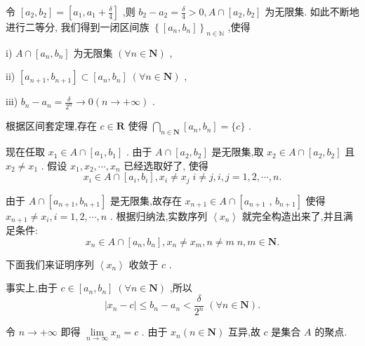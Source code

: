 令 $\left\lbrack  {{a}_{2},{b}_{2}}\right\rbrack   = \left\lbrack  {{a}_{1},{a}_{1} + \frac{\delta }{4}}\right\rbrack$ ,则 ${b}_{2} - {a}_{2} = \frac{\delta }{4} > 0,A \cap  \left\lbrack  {{a}_{2},{b}_{2}}\right\rbrack$ 为无限集. 如此不断地进行二等分, 我们得到一闭区间族 ${\left\{  \left\lbrack  {a}_{n},{b}_{n}\right\rbrack  \right\}  }_{n \in  \mathbb{N}}$ ,使得

i) $A \cap  \left\lbrack  {{a}_{n},{b}_{n}}\right\rbrack$ 为无限集 $\left( {\forall n \in  \mathbf{N}}\right)$ ,

ii) $\left\lbrack  {{a}_{n + 1},{b}_{n + 1}}\right\rbrack   \subset  \left\lbrack  {{a}_{n},{b}_{n}}\right\rbrack  \;\left( {\forall n \in  \mathbf{N}}\right)$ ,

iii) ${b}_{n} - {a}_{n} = \frac{\delta }{{2}^{n}} \rightarrow  0\left( {n \rightarrow   + \infty }\right)$ .

根据区间套定理,存在 $c \in  \mathbf{R}$ 使得 $\mathop{\bigcap }\limits_{{n \in  \mathbf{N}}}\left\lbrack  {{a}_{n},{b}_{n}}\right\rbrack   = \{ c\}$ .

现在任取 ${x}_{1} \in  A \cap  \left\lbrack  {{a}_{1},{b}_{1}}\right\rbrack$ . 由于 $A \cap  \left\lbrack  {{a}_{2},{b}_{2}}\right\rbrack$ 是无限集,取 ${x}_{2} \in  A \cap  \left\lbrack  {{a}_{2},{b}_{2}}\right\rbrack$ 且 ${x}_{2} \neq  {x}_{1}$ . 假设 ${x}_{1},{x}_{2},\cdots ,{x}_{n}$ 已经选取好了, 使得
$${x}_{i} \in  A \cap  \left\lbrack  {{a}_{i},{b}_{i}}\right\rbrack  ,{x}_{i} \neq  {x}_{j}\;i \neq  j,i,j = 1,2,\cdots ,n.$$

由于 $A \cap  \left\lbrack  {{a}_{n + 1},{b}_{n + 1}}\right\rbrack$ 是无限集,故存在 ${x}_{n + 1} \in  A \cap  \left\lbrack  {a}_{n + 1}\right.$ , $\left. {b}_{n + 1}\right\rbrack$ 使得 ${x}_{n + 1} \neq  {x}_{i},i = 1,2,\cdots ,n$ . 根据归纳法,实数序列 $\left\langle  {x}_{n}\right\rangle$ 就完全构造出来了,并且满足条件:
$${x}_{n} \in  A \cap  \left\lbrack  {{a}_{n},{b}_{n}}\right\rbrack  ,{x}_{n} \neq  {x}_{m},n \neq  m\;n,m \in  \mathbf{N}.$$

下面我们来证明序列 $\left\langle  {x}_{n}\right\rangle$ 收敛于 $c$ .

事实上,由于 $c \in  \left\lbrack  {{a}_{n},{b}_{n}}\right\rbrack  \;\left( {\forall n \in  \mathbf{N}}\right)$ ,所以
$$\left| {{x}_{n} - c}\right|  \leq  {b}_{n} - {a}_{n} < \frac{\delta }{{2}^{n}}\;\left( {\forall n \in  \mathbf{N}}\right) .$$

令 $n \rightarrow   + \infty$ 即得 $\mathop{\lim }\limits_{{n \rightarrow  \infty }}{x}_{n} = c$ . 由于 ${x}_{n}\left( {n \in  \mathbf{N}}\right)$ 互异,故 $c$ 是集合 $A$ 的聚点.

